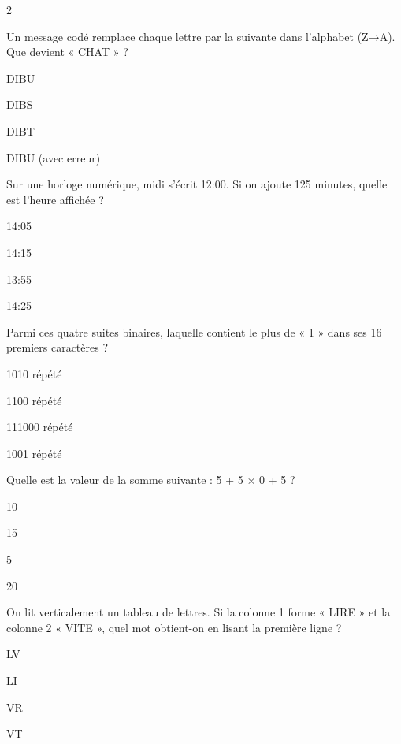 \begin{multicols}{2}
\begin{question}{}{}
Un message codé remplace chaque lettre par la suivante dans l’alphabet (Z→A). Que devient « CHAT » ?
\begin{enumeratebf}
\item DIBU
\item DIBS
\item DIBT
\item DIBU (avec erreur)
\end{enumeratebf}
\end{question}

\begin{question}{}{}
Sur une horloge numérique, midi s’écrit 12:00. Si on ajoute 125 minutes, quelle est l’heure affichée ?
\begin{enumeratebf}
\item 14:05
\item 14:15
\item 13:55
\item 14:25
\end{enumeratebf}
\end{question}

\begin{question}{}{}
Parmi ces quatre suites binaires, laquelle contient le plus de « 1 » dans ses 16 premiers caractères ?
\begin{enumeratebf}
\item 1010 répété
\item 1100 répété
\item 111000 répété
\item 1001 répété
\end{enumeratebf}
\end{question}

\begin{question}{}{}
Quelle est la valeur de la somme suivante : 5 + 5 × 0 + 5 ?
\begin{enumeratebf}
\item 10
\item 15
\item 5
\item 20
\end{enumeratebf}
\end{question}

\begin{question}{}{}
On lit verticalement un tableau de lettres. Si la colonne 1 forme « LIRE » et la colonne 2 « VITE », quel mot obtient-on en lisant la première ligne ?
\begin{enumeratebf}
\item LV
\item LI
\item VR
\item VT
\end{enumeratebf}
\end{question}


\end{multicols}
